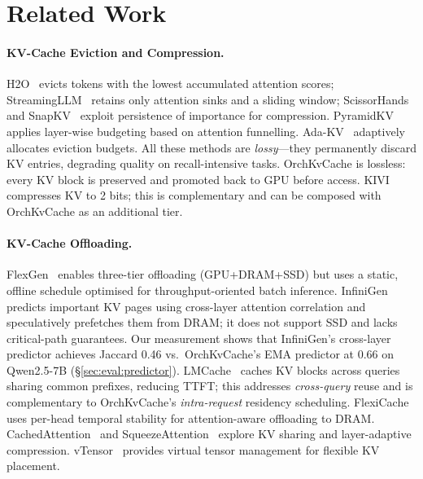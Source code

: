 \documentclass[acmsmall,nonacm,screen]{acmart}
\newcommand{\sys}{OrchKvCache}
\begin{document}
\section{Related Work}\label{sec:related}

\paragraph{KV-Cache Eviction and Compression.}
H2O~\cite{zhang2024h2o} evicts tokens with the lowest accumulated attention
scores; StreamingLLM~\cite{xiao2024streamingllm} retains only attention sinks
and a sliding window; ScissorHands~\cite{liu2024scissorhands} and
SnapKV~\cite{li2024snapkv} exploit persistence of importance for
compression.  PyramidKV~\cite{cai2024pyramidkv} applies layer-wise
budgeting based on attention funnelling.  Ada-KV~\cite{feng2024adakv}
adaptively allocates eviction budgets.
All these methods are \emph{lossy}---they permanently discard KV entries,
degrading quality on recall-intensive tasks.  \sys{} is lossless: every
KV block is preserved and promoted back to GPU before access.
KIVI~\cite{liu2024kivi} compresses KV to 2 bits; this is complementary
and can be composed with \sys{} as an additional tier.

\paragraph{KV-Cache Offloading.}
FlexGen~\cite{sheng2023flexgen} enables three-tier offloading (GPU+DRAM+SSD)
but uses a static, offline schedule optimised for throughput-oriented batch
inference.  InfiniGen~\cite{lee2024infinigen} predicts important KV pages
using cross-layer attention correlation and speculatively prefetches them
from DRAM; it does not support SSD and lacks critical-path guarantees.
Our measurement shows that InfiniGen's cross-layer predictor achieves
Jaccard 0.46 vs.\ \sys{}'s EMA predictor at 0.66 on Qwen2.5-7B
(\S\ref{sec:eval:predictor}).
LMCache~\cite{yao2024lmcache} caches KV blocks across queries sharing
common prefixes, reducing TTFT; this addresses \emph{cross-query} reuse
and is complementary to \sys{}'s \emph{intra-request} residency scheduling.
FlexiCache~\cite{li2024flexicache} uses per-head temporal stability for
attention-aware offloading to DRAM.
CachedAttention~\cite{gao2024cachedattention} and
SqueezeAttention~\cite{yang2024squeezeattention} explore KV sharing and
layer-adaptive compression.
vTensor~\cite{xu2024vtensor} provides virtual tensor management for
flexible KV placement.
\end{document}
